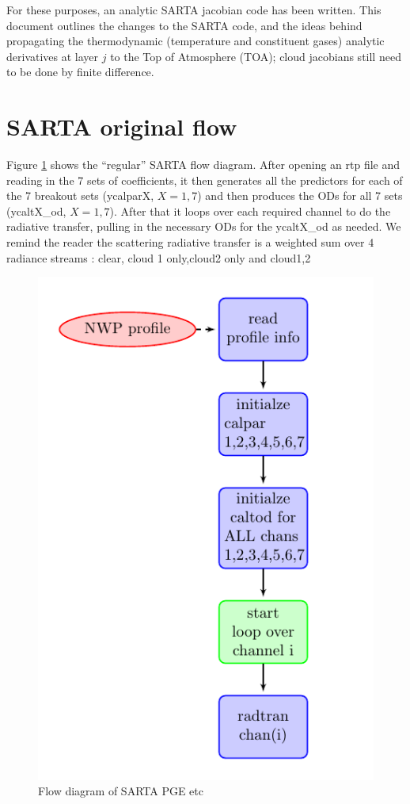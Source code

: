 \documentclass[11pt]{article}
\newcommand{\sa}{\textsf{SARTA}\xspace}
\begin{document}
For these purposes, an analytic \sa jacobian code has been
written. This document outlines the changes to the \sa code, and the
ideas behind propagating the thermodynamic (temperature and
constituent gases) analytic derivatives at layer $j$ to the Top of
Atmosphere (TOA); cloud jacobians still need to be done by finite
difference.

\section{\sa original flow}

Figure \ref{fig:fig1} shows the ``regular'' \sa flow diagram. After
opening an rtp file and reading in the 7 sets of coefficients, it then
generates all the predictors for each of the 7 breakout sets
(ycalparX, $X=1,7$) and then produces the ODs for all 7 sets
  (ycaltX\_od, $X=1,7$). After that it loops over each required channel
    to do the radiative transfer, pulling in the necessary ODs for the
    ycaltX\_od as needed.  We remind the reader the scattering
    radiative transfer is a weighted sum over 4 radiance streams :
    clear, cloud 1 only,cloud2 only and cloud1,2

\begin{figure}[ht] \centering
   \includegraphics[width=.75\textwidth]{sarta_diagram1.pdf}
\caption{Flow diagram of \sa PGE etc}
\label{fig:fig1}
\end{figure}
\end{document}
